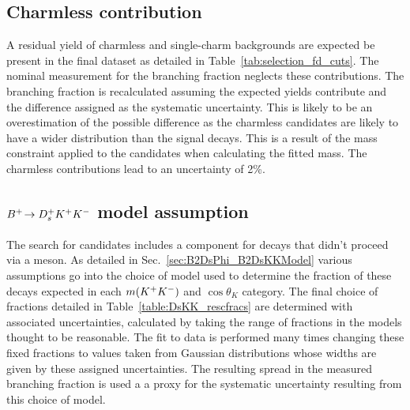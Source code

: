


\subsection{Charmless contribution}
A residual yield of charmless and single-charm backgrounds are expected be present in the final dataset as detailed in Table~\ref{tab:selection_fd_cuts}. The nominal measurement for the branching fraction neglects these contributions. The branching fraction is recalculated assuming the expected yields contribute and the difference assigned as the systematic uncertainty. This is likely to be an overestimation of the possible difference as the charmless candidates are likely to have a wider distribution than the signal decays. This is a result of the \Dsp mass constraint applied to the candidates when calculating the fitted \Bp mass. 
The charmless contributions lead to an uncertainty of 2\%.

\subsection{${{{B}^+}}\!\rightarrow {\ensuremath{{D}^+_{s}}}{\ensuremath{{K}^+}}{\ensuremath{{K}^-}}$ model assumption}
The search for \decay{\Bp}{\Dsp\phiz} candidates includes a component for \decay{\Bp}{\Dsp\Kp\Km} decays that didn't proceed via a \phiz meson. As detailed in Sec.~\ref{sec:B2DsPhi_B2DsKKModel} various assumptions go into the choice of \decay{\Bp}{\Dsp\Kp\Km} model used to determine the fraction of these decays expected in each $m({{K}^+}{{K}^-})$ and $\cos{\theta_{K}}$ category. The final choice of fractions detailed in Table~\ref{table:DsKK_rescfracs} are determined with associated uncertainties, calculated by taking the range of fractions in the models thought to be reasonable. The fit to data is performed many times changing these fixed fractions to values taken from Gaussian distributions whose widths are given by these assigned uncertainties. The resulting spread in the measured branching fraction is used a a proxy for the systematic uncertainty resulting from this choice of model. 

